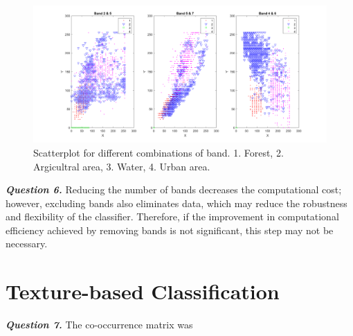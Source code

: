 \documentclass[12pt]{article}
\begin{document}
\begin{figure}
  \centering
  \includegraphics[width = 15cm]{images/Q5_scatter.png}
  \caption{Scatterplot for different combinations of band. 1. Forest, 2. Argicultral area, 3. Water, 4. Urban area. }
  \label{fig:Q5_scatter}
\end{figure}

\textbf{\emph{Question 6.}}
Reducing the number of bands decreases the computational cost; however, excluding bands also eliminates data, which may reduce the robustness and flexibility of the classifier. Therefore, if the improvement in computational efficiency achieved by removing bands is not significant, this step may not be necessary.
\section{Texture-based Classification}
\textbf{\emph{Question 7.}}
The co-occurrence matrix was 
\end{document}
